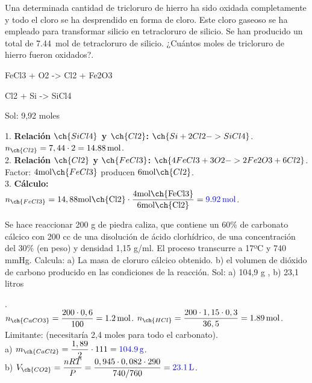 \begin{exercise}
    Una determinada cantidad de tricloruro de hierro ha sido oxidada completamente y todo el cloro se ha desprendido en forma de cloro. Este cloro gaseoso se ha empleado para transformar silicio en tetracloruro de silicio. Se han producido un total de \qty{7.44}{\mol} de tetracloruro de silicio. ¿Cuántos moles de tricloruro de hierro fueron oxidados?.
    \begin{reaction*}
        FeCl3 + O2 -> Cl2 + Fe2O3
    \end{reaction*}
    \begin{reaction*}
        Cl2 + Si -> SiCl4
    \end{reaction*}
    Sol: 9,92 moles
    \begin{solu}
        1. \textbf{Relación \( \ch{SiCl4} \) y \( \ch{Cl2} \):} \( \ch{Si + 2 Cl2 -> SiCl4} \). \\
        \( n_{\ch{Cl2}} = 7,44 \cdot 2 = \qty{14,88}{\mol} \). \\
        2. \textbf{Relación \( \ch{Cl2} \) y \( \ch{FeCl3} \):} \( \ch{4 FeCl3 + 3 O2 -> 2 Fe2O3 + 6 Cl2} \). \\
        Factor: \( 4 \si{\mol} \ch{FeCl3} \) producen \( 6 \si{\mol} \ch{Cl2} \). \\
        3. \textbf{Cálculo:} \\
        \( n_{\ch{FeCl3}} = 14,88 \si{\mol \ch{Cl2}} \cdot \dfrac{4 \si{\mol \ch{FeCl3}}}{6 \si{\mol \ch{Cl2}}} = \textbf{\textcolor{blue}{\qty{9,92}{\mol}}} \).
    \end{solu}

\end{exercise}

\begin{exercise}
    Se hace reaccionar 200 g de piedra caliza, que contiene un 60\% de carbonato cálcico con 200 cc de una disolución de ácido clorhídrico, de una concentración del 30\% (en peso) y densidad 1,15 g/ml. El proceso transcurre a 17ºC y 740 mmHg. Calcula: a) La masa de cloruro cálcico obtenido. b) el volumen de dióxido de carbono producido en las condiciones de la reacción. Sol: a) 104,9 g ,  b) 23,1 litros
    \begin{solu}
        . \\
        $n_{\ch{CaCO3}} = \dfrac{200 \cdot 0,6}{100} = \qty{1,2}{\mol}$. $n_{\ch{HCl}} = \dfrac{200 \cdot 1,15 \cdot 0,3}{36,5} = \qty{1,89}{\mol}$. \\
        Limitante:  (necesitaría 2,4 moles para todo el carbonato). \\
        a) $m_{\ch{CaCl2}} = \dfrac{1,89}{2} \cdot 111 = \mathbf{\textcolor{blue}{\qty{104,9}{\g}}}$. \\
        b) $V_{\ch{CO2}} = \dfrac{nRT}{P} = \dfrac{0,945 \cdot 0,082 \cdot 290}{740/760} = \mathbf{\textcolor{blue}{\qty{23,1}{\L}}}$.
    \end{solu}
\end{exercise}

